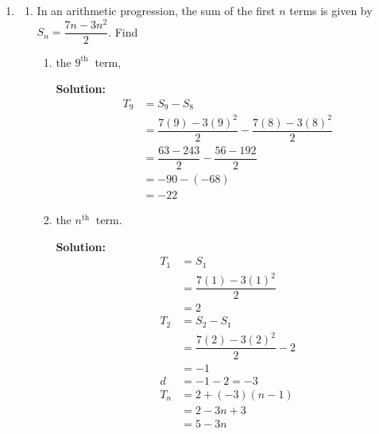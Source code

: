 \documentclass{report}
\newcommand{\sol}{\textbf{Solution:}}
\begin{document}
\begin{enumerate}[leftmargin=*]
    \item \begin{enumerate}
              \item In an arithmetic progression, the sum of the first $n$ terms is given by
                    $S_n=\dfrac{7 n-3 n^2}{2}$. Find
                    \begin{enumerate}
                        \item the $9^{\text {th }}$ term,

                              \sol{}
                              \begin{align*}
                                  T_9 & = S_9 - S_8                                           \\
                                      & = \dfrac{7(9) - 3(9)^2}{2} - \dfrac{7(8) - 3(8)^2}{2} \\
                                      & = \dfrac{63 - 243}{2} - \dfrac{56 - 192}{2}           \\
                                      & = -90 - (-68)                                         \\
                                      & = -22
                              \end{align*}

                              \newpage
                        \item the $n^{\text {th }}$ term.

                              \sol{}
                              \begin{align*}
                                  T_1 & = S_1                          \\
                                      & = \dfrac{7(1) - 3(1)^2}{2}     \\
                                      & = 2                            \\
                                  T_2 & = S_2 - S_1                    \\
                                      & = \dfrac{7(2) - 3(2)^2}{2} - 2 \\
                                      & = -1                           \\
                                  d   & = -1 - 2 = -3                  \\
                                  T_n & = 2 + (-3)(n-1)                \\
                                      & = 2 - 3n + 3                   \\
                                      & = 5 - 3n
                              \end{align*}
                    \end{enumerate}


\end{enumerate}
\end{enumerate}
\end{document}
